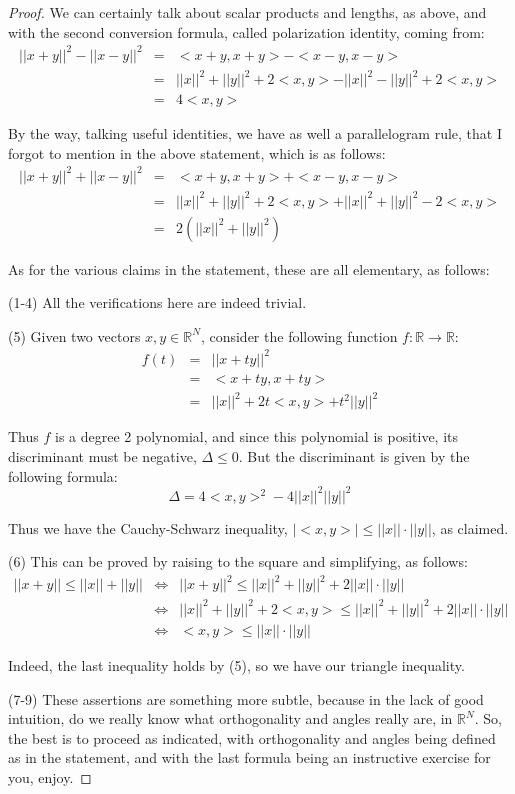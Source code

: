 \documentclass[12pt]{amsbook}
\begin{document}
\begin{proof}
We can certainly talk about scalar products and lengths, as above, and with the second conversion formula, called polarization identity, coming from:
\begin{eqnarray*}
||x+y||^2-||x-y||^2
&=&<x+y,x+y>-<x-y,x-y>\\
&=&||x||^2+||y||^2+2<x,y>-||x||^2-||y||^2+2<x,y>\\
&=&4<x,y>
\end{eqnarray*}

By the way, talking useful identities, we have as well a parallelogram rule, that I forgot to mention in the above statement, which is as follows:
\begin{eqnarray*}
||x+y||^2+||x-y||^2
&=&<x+y,x+y>+<x-y,x-y>\\
&=&||x||^2+||y||^2+2<x,y>+||x||^2+||y||^2-2<x,y>\\
&=&2(||x||^2+||y||^2)
\end{eqnarray*}

As for the various claims in the statement, these are all elementary, as follows:

\medskip

(1-4) All the verifications here are indeed trivial.

\medskip

(5) Given two vectors $x,y\in\mathbb R^N$, consider the following function $f:\mathbb R\to\mathbb R$:
\begin{eqnarray*}
f(t)
&=&||x+ty||^2\\
&=&<x+ty,x+ty>\\
&=&||x||^2+2t<x,y>+t^2||y||^2
\end{eqnarray*}

Thus $f$ is a degree 2 polynomial, and since this polynomial is positive, its discriminant must be negative, $\Delta\leq0$. But the discriminant is given by the following formula:
$$\Delta=4<x,y>^2-4||x||^2||y||^2$$

Thus we have the Cauchy-Schwarz inequality, $|<x,y>|\leq||x||\cdot||y||$, as claimed. 

\medskip

(6) This can be proved by raising to the square and simplifying, as follows:
\begin{eqnarray*}
||x+y||\leq||x||+||y||
&\iff&||x+y||^2\leq||x||^2+||y||^2+2||x||\cdot||y||\\
&\iff&||x||^2+||y||^2+2<x,y>\leq||x||^2+||y||^2+2||x||\cdot||y||\\
&\iff&<x,y>\leq||x||\cdot||y||
\end{eqnarray*}

Indeed, the last inequality holds by (5), so we have our triangle inequality.

\medskip

(7-9) These assertions are something more subtle, because in the lack of good intuition, do we really know what orthogonality and angles really are, in $\mathbb R^N$. So, the best is to proceed as indicated, with orthogonality and angles being defined as in the statement, and with the last formula being an instructive exercise for you, enjoy.
\end{proof}
\end{document}
